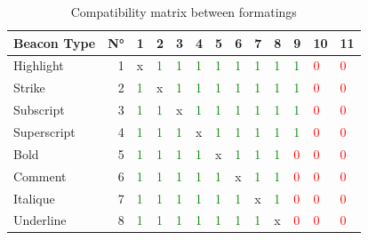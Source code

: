 \documentclass[a4paper,12pt]{article}
\begin{document}
\begin{table}[htbp]
\caption{\label{tab:orgbbe6cb8}Compatibility matrix between formatings}
\centering
\begin{tabular}{lrlllllllllll}
\hline
Beacon Type & N° & 1 & 2 & 3 & 4 & 5 & 6 & 7 & 8 & 9 & 10 & 11\\
\hline
Highlight & 1 & x & \textcolor{green}{1} & \textcolor{green}{1} & \textcolor{green}{1} & \textcolor{green}{1} & \textcolor{green}{1} & \textcolor{green}{1} & \textcolor{green}{1} & \textcolor{green}{1} & \textcolor{red}{0} & \textcolor{red}{0}\\
Strike & 2 & \textcolor{green}{1} & x & \textcolor{green}{1} & \textcolor{green}{1} & \textcolor{green}{1} & \textcolor{green}{1} & \textcolor{green}{1} & \textcolor{green}{1} & \textcolor{green}{1} & \textcolor{red}{0} & \textcolor{red}{0}\\
Subscript & 3 & \textcolor{green}{1} & \textcolor{green}{1} & x & \textcolor{green}{1} & \textcolor{green}{1} & \textcolor{green}{1} & \textcolor{green}{1} & \textcolor{green}{1} & \textcolor{green}{1} & \textcolor{red}{0} & \textcolor{red}{0}\\
Superscript & 4 & \textcolor{green}{1} & \textcolor{green}{1} & \textcolor{green}{1} & x & \textcolor{green}{1} & \textcolor{green}{1} & \textcolor{green}{1} & \textcolor{green}{1} & \textcolor{green}{1} & \textcolor{red}{0} & \textcolor{red}{0}\\
Bold & 5 & \textcolor{green}{1} & \textcolor{green}{1} & \textcolor{green}{1} & \textcolor{green}{1} & x & \textcolor{green}{1} & \textcolor{green}{1} & \textcolor{green}{1} & \textcolor{red}{0} & \textcolor{red}{0} & \textcolor{red}{0}\\
Comment & 6 & \textcolor{green}{1} & \textcolor{green}{1} & \textcolor{green}{1} & \textcolor{green}{1} & \textcolor{green}{1} & x & \textcolor{green}{1} & \textcolor{green}{1} & \textcolor{red}{0} & \textcolor{red}{0} & \textcolor{red}{0}\\
Italique & 7 & \textcolor{green}{1} & \textcolor{green}{1} & \textcolor{green}{1} & \textcolor{green}{1} & \textcolor{green}{1} & \textcolor{green}{1} & x & \textcolor{green}{1} & \textcolor{red}{0} & \textcolor{red}{0} & \textcolor{red}{0}\\
Underline & 8 & \textcolor{green}{1} & \textcolor{green}{1} & \textcolor{green}{1} & \textcolor{green}{1} & \textcolor{green}{1} & \textcolor{green}{1} & \textcolor{green}{1} & x & \textcolor{red}{0} & \textcolor{red}{0} & \textcolor{red}{0}\\

\end{tabular}
\end{table}
\end{document}
